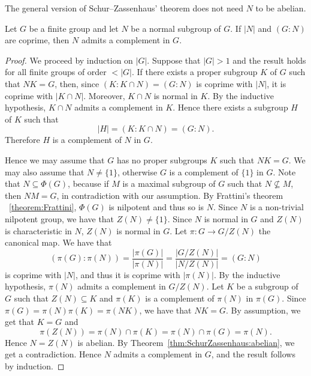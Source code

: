 The general version of 
Schur--Zassenhaus' theorem does not need $N$ to be abelian. 


\begin{theorem}
	\label{thm:SchurZassenhaus}
	Let $G$ be a finite group and let $N$ be a normal subgroup of $G$. If 
	$|N|$ and $(G:N)$ are coprime, then $N$ admits a complement in $G$. 
\end{theorem}

\begin{proof}
	We proceed by induction on $|G|$. Suppose that $|G|>1$ and the result holds for all finite groups of order $<|G|$.
	If there exists a proper subgroup $K$ of
	$G$ such that $NK=G$, then, since $(K:K\cap N)=(G:N)$ is coprime with $|N|$, it is coprime with  
	$|K\cap N|$. Moreover, $K\cap N$ is normal in $K$. By the inductive hypothesis, 
	$K\cap N$ admits a complement in $K$. Hence there exists a subgroup 
    $H$ of $K$ such that 
    \[
    |H|=(K:K\cap N)=(G:N).
    \] 
	Therefore $H$ is a complement of $N$ in $G$.
	
	Hence we may assume that $G$ has no proper subgroups $K$ such that  $NK=G$.  We may also assume that $N\ne\{1\}$, otherwise $G$ is a complement of $\{ 1\}$ in $G$.
	Note that $N\subseteq \Phi(G)$, because if $M$ is a maximal subgroup of $G$ such that $N\not\subseteq M$, then $NM=G$, in contradiction with our assumption. By Frattini's theorem ~\ref{theorem:Frattini}, $\Phi(G)$ is nilpotent and thus so is $N$. Since $N$ is a non-trivial nilpotent group, we have that $Z(N)\ne\{1\}$. Since $N$ is normal in $G$ and $Z(N)$ is
	characteristic in $N$, $Z(N)$ is normal in $G$. Let $\pi\colon G\to
	G/Z(N)$ the canonical map.   We have that 
	\[
	(\pi(G):\pi(N))=\frac{|\pi(G)|}{|\pi(N)|}=\frac{|G/Z(N)|}{|N/Z(N)|}=(G:N)
	\]
	is coprime with $|N|$, and thus it is coprime with $|\pi(N)|$. 
	By the inductive hypothesis, $\pi(N)$ admits a complement in $G/Z(N)$. 
	Let $K$ be a subgroup of $G$ such that $Z(N)\subseteq K$ and $\pi(K)$ is a complement of $\pi(N)$ in $\pi(G)$. Since 
	$\pi(G)=\pi(N)\pi(K)=\pi(NK)$, we have that $NK=G$. 
	By assumption, we get that $K=G$ and 
	\[
		\pi(Z(N))=\pi(N)\cap\pi(K)=\pi(N)\cap\pi(G)=\pi(N).
	\]
	Hence $N=Z(N)$ is abelian. By 
	Theorem~\ref{thm:SchurZassenhaus:abelian}, we get a contradiction. Hence $N$ admits a complement in $G$, and the result follows by induction.
\end{proof}

